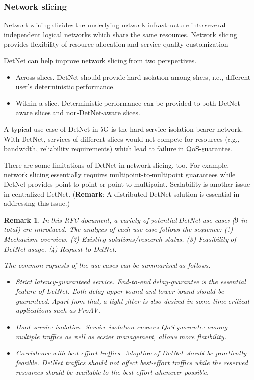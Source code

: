 \documentclass[12pt]{article}
\newtheorem*{remark}{Remark}
\begin{document}
\subsubsection{Network slicing}
Network slicing divides the underlying network infrastructure into several independent logical networks which share the same resources. Network slicing provides flexibility of resource allocation and service quality customization. 

DetNet can help improve network slicing from two perspectives. 
\begin{itemize}
    \item Across slices. DetNet should provide hard isolation among slices, i.e., different user's deterministic performance. 
    \item Within a slice.  Deterministic performance can be provided to both DetNet-aware slices and non-DetNet-aware slices.
\end{itemize}

A typical use case of DetNet in 5G is the hard service isolation bearer network. With DetNet, services of different slices would not compete for resources (e.g., bandwidth, reliability requirements) which lead to failure in QoS-guarantee. 

There are some limitations of DetNet in network slicing, too. For example, network slicing essentially requires multipoint-to-multipoint guarantees while DetNet provides point-to-point or point-to-multipoint. Scalability is another issue in centralized DetNet. (\textbf{Remark}: A distributed DetNet solution is essential in addressing this issue.)

\begin{remark}
In this RFC document, a variety of potential DetNet use cases ($9$ in total) are introduced. The analysis of each use case follows the sequence: (1) Mechanism overview. (2) Existing solutions/research status. (3) Feasibility of DetNet usage. (4) Request to DetNet.

The common requests of the use cases can be summarised as follows.
\begin{itemize}
    \item Strict latency-guaranteed service. End-to-end delay-guarantee is the essential feature of DetNet. Both delay upper bound and lower bound should be guaranteed. Apart from that, a tight jitter is also desired in some time-critical applications such as ProAV.  
    \item Hard service isolation. Service isolation ensures QoS-guarantee among multiple traffics as well as easier management, allows more flexibility. 
    \item Coexistence with best-effort traffics. Adoption of DetNet should be practically feasible. DetNet traffics should not affect best-effort traffics while the reserved resources should be available to the best-effort whenever possible.
\end{itemize}

\end{remark}
\end{document}
